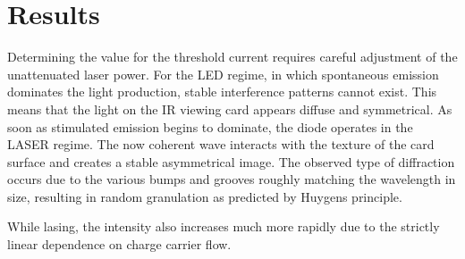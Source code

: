 \section{Results}
\label{sec:results}

Determining the value for the threshold current requires careful adjustment of the unattenuated laser power. For the LED regime,
in which spontaneous emission dominates the light production, stable interference patterns cannot exist. This means that the
light on the IR viewing card appears diffuse and symmetrical. As soon as stimulated emission begins to dominate, the diode
operates in the LASER regime. The now coherent wave interacts with the texture of the card surface and creates a stable asymmetrical
image. The observed type of diffraction occurs due to the various bumps and grooves roughly matching the wavelength in size, resulting
in random granulation as predicted by Huygens principle. 

While lasing, the intensity also increases much more rapidly due to the strictly linear dependence on charge carrier flow.

